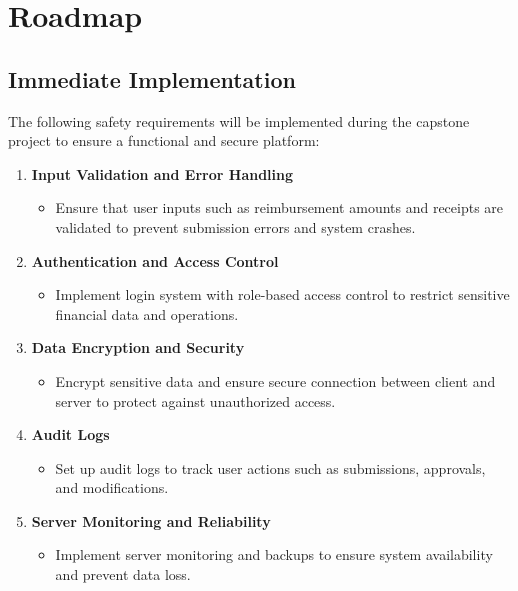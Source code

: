 \documentclass{article}
\begin{document}
\section{Roadmap}
\subsection{Immediate Implementation}

The following safety requirements will be implemented during the capstone project to ensure a functional and secure platform:

\begin{enumerate}
    \item \textbf{Input Validation and Error Handling}
    \begin{itemize}
        \item Ensure that user inputs such as reimbursement amounts and receipts are validated to prevent submission errors and system crashes.
    \end{itemize}

    \item \textbf{Authentication and Access Control}
    \begin{itemize}
        \item Implement login system with role-based access control to restrict sensitive financial data and operations.
    \end{itemize}

    \item \textbf{Data Encryption and Security}
    \begin{itemize}
        \item Encrypt sensitive data and ensure secure connection between client and server to protect against unauthorized access.
    \end{itemize}

    \item \textbf{Audit Logs}
    \begin{itemize}
        \item Set up audit logs to track user actions such as submissions, approvals, and modifications.
    \end{itemize}

    \item \textbf{Server Monitoring and Reliability}
    \begin{itemize}
        \item Implement server monitoring and backups to ensure system availability and prevent data loss.
    \end{itemize}
    
\end{enumerate}
\end{document}
